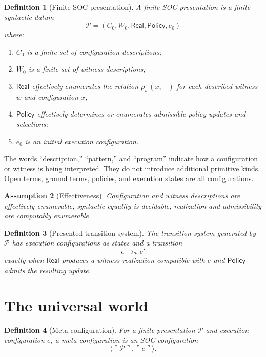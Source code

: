 \documentclass[11pt]{article}
\newtheorem{definition}{Definition}[section]
\newtheorem{assumption}[definition]{Assumption}
\theoremstyle{remark}
\newcommand{\Pres}{\mathcal{P}}
\newcommand{\enc}[1]{\ulcorner #1 \urcorner}
\begin{document}
\begin{definition}[Finite SOC presentation]
A finite SOC presentation is a finite syntactic datum
\[
  \Pres=(C_0,W_0,\mathsf{Real},\mathsf{Policy},e_0)
\]
where:
\begin{enumerate}[label=(\roman*)]
  \item $C_0$ is a finite set of configuration descriptions;
  \item $W_0$ is a finite set of witness descriptions;
  \item $\mathsf{Real}$ effectively enumerates the relation
        $\rho_w(x,-)$ for each described witness $w$ and configuration $x$;
  \item $\mathsf{Policy}$ effectively determines or enumerates admissible
        policy updates and selections;
  \item $e_0$ is an initial execution configuration.
\end{enumerate}
\end{definition}

The words ``description,'' ``pattern,'' and ``program'' indicate how a
configuration or witness is being interpreted. They do not introduce
additional primitive kinds. Open terms, ground terms, policies, and execution
states are all configurations.

\begin{assumption}[Effectiveness]
Configuration and witness descriptions are effectively enumerable; syntactic
equality is decidable; realization and admissibility are computably
enumerable.
\end{assumption}

\begin{definition}[Presented transition system]
The transition system generated by $\Pres$ has execution configurations as
states and a transition
\[
  e\longrightarrow_{\Pres}e'
\]
exactly when $\mathsf{Real}$ produces a witness realization compatible with
$e$ and $\mathsf{Policy}$ admits the resulting update.
\end{definition}

\section{The universal world}
\label{sec:universal}

\begin{definition}[Meta-configuration]
For a finite presentation $\Pres$ and execution configuration $e$, a
meta-configuration is an SOC configuration
\[
  \langle\enc{\Pres},\enc{e}\rangle.
\]
\end{definition}
\end{document}
